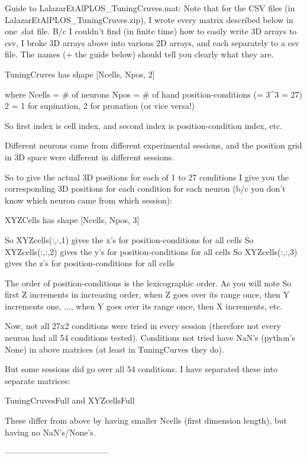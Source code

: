 Guide to LalazarEtAlPLOS_TuningCruves.mat:
Note that for the CSV files (in LalazarEtAlPLOS_TuningCruves.zip),
I wrote every matrix described below in one .dat file.
B/c I couldn't find (in finite time) how to easily write 3D arrays to csv, I broke 3D
arrays above into various 2D arrays, and each separately to a csv file. The names (+ the guide below) should tell you clearly what they are. 




TuningCruves  has shape [Ncells, Npos, 2]

where 
	  Ncells = # of neurons
           Npos = # of hand position-conditions (= 3^3 = 27)
           2      = 1 for supination, 2 for pronation (or vice versa!)
           
So first index is cell index, and second index is position-condition index, etc.            
           
Different neurons came from different experimental sessions, and
the position grid in 3D space were different in different sessions. 

So to give the actual 3D positions for each of 1 to 27 conditions I give you
the corresponding 3D positions for each condition for each neuron (b/c you don't know which neuron came from which session):

XYZCells  has  shape [Ncells, Npos, 3]

So XYZcells(:,:,1) gives the x's for position-conditions for all cells
So XYZcells(:,:,2) gives the y's for position-conditions for all cells
So XYZcells(:,:,3) gives the z's for position-conditions for all cells


The order of position-conditions is the lexicographic order. As you will note
So first Z increments in increasing order, when Z goes over its range once, then Y increments one, ..., when Y goes over its range once, then X increments, etc. 



Now, not all 27x2 conditions were tried in every session (therefore not every neuron had all 54 conditions tested). Conditions not tried have NaN's (python's None) in above matrices (at least in TuningCurves they do).

But some sessions did go over all 54 conditions. I have separated these into  separate matrices:

TuningCruvesFull
and
XYZcellsFull

These differ from above by having smaller Ncells (first dimension length), but 
having no  NaN's/None's.



--------------------------------------


